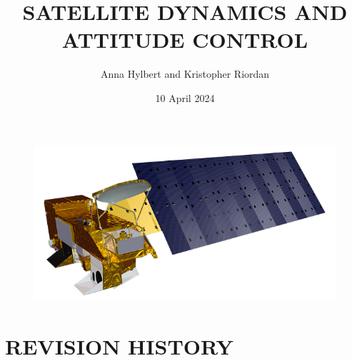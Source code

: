 \documentclass[12pt,a4paper,notitlepage]{article}
\begin{document}
\title{\Huge \textbf{SATELLITE DYNAMICS AND ATTITUDE CONTROL}}
\author{Anna Hylbert and Kristopher Riordan}
\date{10 April 2024}

\begin{minipage}[h]{\textwidth}
	\vspace{4 cm}
	\advance\leftskip-1in
    \maketitle
\end{minipage}

\begin{figure}[H]
\centering
\includegraphics[width = 15cm]{Images/Aqua_spacecraft_model.png}
\end{figure}

\pagebreak

\section*{\Large REVISION HISTORY}
\end{document}
